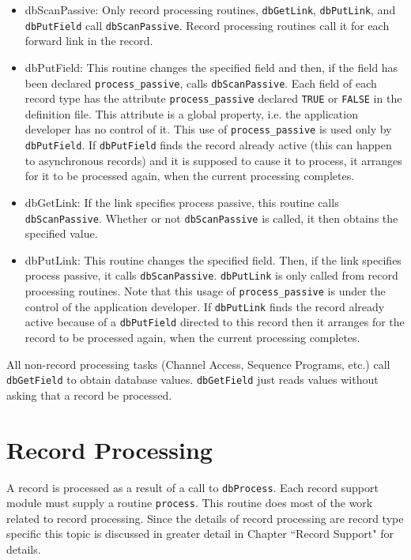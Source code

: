 \begin{itemize}\item {}dbScanPassive:  Only record processing routines, \verb|dbGetLink|, \verb|dbPutLink|, and \verb|dbPutField| call 
\verb|dbScanPassive|. Record processing routines call it for each forward link in the record. 

\item {}dbPutField:  This routine changes the specified field and then, if the field has been declared \verb|process_passive|, 
calls \verb|dbScanPassive|. Each field of each record type has the attribute \verb|process_passive| declared \verb|TRUE| or 
\verb|FALSE| in the definition file. This attribute is a global property, i.e. the application developer has no control of it. 
This use of \verb|process_passive| is used only by \verb|dbPutField|. If \verb|dbPutField| finds the record already active 
(this can happen to asynchronous records) and it is supposed to cause it to process, it arranges for it to be processed 
again, when the current processing completes.

\item {}dbGetLink:  If the link specifies process passive, this routine calls \verb|dbScanPassive|. Whether or not 
\verb|dbScanPassive| is called, it then obtains the specified value. 

\item {}dbPutLink:  This routine changes the specified field. Then, if the link specifies process passive, it calls 
\verb|dbScanPassive|. \verb|dbPutLink| is only called from record processing routines. Note that this usage of 
\verb|process_passive| is under the control of the application developer. If \verb|dbPutLink| finds the record already 
active because of a \verb|dbPutField| directed to this record then it arranges for the record to be processed again,  
when the current processing completes.

\end{itemize}All non-record processing tasks (Channel Access, Sequence Programs, etc.) call \verb|dbGetField| to obtain database values. 
\verb|dbGetField| just reads values without asking that a record be processed.

\section{Record Processing}

A record is processed as a result of a call to \verb|dbProcess|. Each record support module must supply a routine \verb|process|. 
This routine does most of the work related to record processing. Since the details of record processing are record type 
specific this topic is discussed in greater detail in Chapter ``Record Support" for details.

